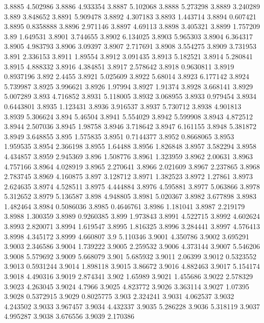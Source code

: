 3.8885  4.502986
3.8886  4.933354
3.8887  5.102068
3.8888  5.273298
3.8889  3.240289
3.889  3.848652
3.8891  5.909478
3.8892  4.307183
3.8893  1.443714
3.8894  0.607421
3.8895  0.8358888
3.8896  2.971146
3.8897  4.69113
3.8898  3.405321
3.8899  1.757209
3.89  1.649531
3.8901  3.744655
3.8902  6.134025
3.8903  5.965303
3.8904  6.364317
3.8905  4.983793
3.8906  3.09397
3.8907  2.717691
3.8908  3.554275
3.8909  3.731953
3.891  2.336153
3.8911  1.89554
3.8912  3.091435
3.8913  5.182521
3.8914  5.280841
3.8915  4.888332
3.8916  4.384851
3.8917  2.578642
3.8918  0.9630811
3.8919  0.8937196
3.892  2.4455
3.8921  5.025609
3.8922  5.68014
3.8923  6.177142
3.8924  5.739987
3.8925  3.996621
3.8926  1.97994
3.8927  1.91374
3.8928  3.668141
3.8929  5.007289
3.893  4.716852
3.8931  5.118005
3.8932  3.068955
3.8933  0.979454
3.8934  0.6443801
3.8935  1.123431
3.8936  3.916537
3.8937  5.730712
3.8938  4.901813
3.8939  5.306624
3.894  5.46504
3.8941  5.554029
3.8942  5.599908
3.8943  4.872512
3.8944  2.507036
3.8945  1.98758
3.8946  3.718642
3.8947  6.161155
3.8948  5.381872
3.8949  3.648855
3.895  1.575835
3.8951  0.7144377
3.8952  0.8668065
3.8953  1.959535
3.8954  2.366198
3.8955  1.64488
3.8956  1.826848
3.8957  3.582294
3.8958  4.434857
3.8959  2.945369
3.896  1.508776
3.8961  1.323959
3.8962  2.00631
3.8963  4.757166
3.8964  4.028919
3.8965  2.270641
3.8966  2.021609
3.8967  2.237865
3.8968  2.783745
3.8969  4.160875
3.897  3.128712
3.8971  1.382523
3.8972  1.27861
3.8973  2.624635
3.8974  4.528511
3.8975  4.444884
3.8976  4.595881
3.8977  5.063866
3.8978  5.312652
3.8979  5.136587
3.898  4.948805
3.8981  5.020367
3.8982  3.677898
3.8983  1.482464
3.8984  0.5086036
3.8985  0.4646761
3.8986  1.181041
3.8987  2.219179
3.8988  1.300359
3.8989  0.9260385
3.899  1.973843
3.8991  4.522715
3.8992  4.602624
3.8993  2.820071
3.8994  1.619547
3.8995  1.816325
3.8996  3.284441
3.8997  4.576413
3.8998  4.345172
3.8999  4.660807
3.9  5.110346
3.9001  4.350786
3.9002  3.695291
3.9003  2.346586
3.9004  1.739222
3.9005  2.259532
3.9006  4.373144
3.9007  5.546206
3.9008  5.579692
3.9009  5.668079
3.901  5.685932
3.9011  2.06399
3.9012  0.5323552
3.9013  0.5931244
3.9014  1.898118
3.9015  3.86672
3.9016  4.882463
3.9017  5.154174
3.9018  4.490316
3.9019  2.874341
3.902  1.65989
3.9021  1.455686
3.9022  2.578329
3.9023  4.263045
3.9024  4.7966
3.9025  4.823772
3.9026  3.363114
3.9027  1.07395
3.9028  0.5372915
3.9029  0.8025775
3.903  2.324241
3.9031  4.062537
3.9032  4.243502
3.9033  3.967457
3.9034  4.432337
3.9035  5.286228
3.9036  5.318119
3.9037  4.995287
3.9038  3.676556
3.9039  2.170386

